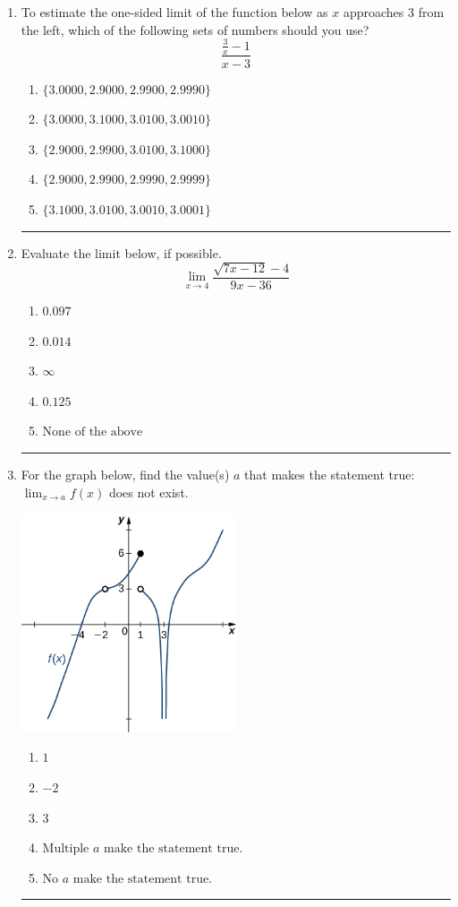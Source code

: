 \documentclass[14pt]{extbook}
\newcommand{\litem}[1]{\item#1\hspace*{-1cm}\rule{\textwidth}{0.4pt}}
\begin{document}
\begin{enumerate}
{\begin{enumerate}[label=\Alph*.]
\end{enumerate} }
\litem{
To estimate the one-sided limit of the function below as $x$ approaches 3 from the left, which of the following sets of numbers should you use?\[ \frac{\frac{3}{x} - 1}{x - 3} \]\begin{enumerate}[label=\Alph*.]
\item \( \{ 3.0000, 2.9000, 2.9900, 2.9990 \} \)
\item \( \{ 3.0000, 3.1000, 3.0100, 3.0010 \} \)
\item \( \{ 2.9000, 2.9900, 3.0100, 3.1000 \} \)
\item \( \{ 2.9000, 2.9900, 2.9990, 2.9999 \} \)
\item \( \{ 3.1000, 3.0100, 3.0010, 3.0001 \} \)

\end{enumerate} }
\litem{
Evaluate the limit below, if possible.\[ \lim_{x \rightarrow 4} \frac{\sqrt{7x - 12} - 4}{9x - 36} \]\begin{enumerate}[label=\Alph*.]
\item \( 0.097 \)
\item \( 0.014 \)
\item \( \infty \)
\item \( 0.125 \)
\item \( \text{None of the above} \)

\end{enumerate} }
\litem{
For the graph below, find the value(s) $a$ that makes the statement true: $ \displaystyle \lim_{x \rightarrow a} f(x)$ does not exist.
\begin{center}
    \includegraphics[width=0.5\textwidth]{../Figures/evaluateLimitGraphicallyCopyA.png}
\end{center}
\begin{enumerate}[label=\Alph*.]
\item \( 1 \)
\item \( -2 \)
\item \( 3 \)
\item \( \text{Multiple } a \text{ make the statement true}. \)
\item \( \text{No } a \text{ make the statement true}. \)


\end{enumerate}}
\end{enumerate}
\end{document}
